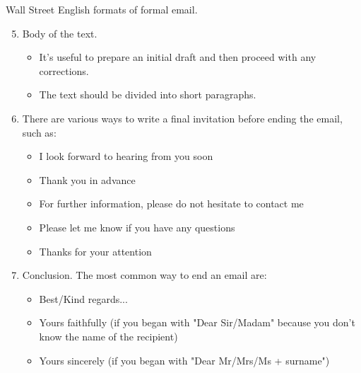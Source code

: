 \documentclass{beamer}
\begin{document}
\begin{frame}{Wall Street English formats of formal email.}
  \begin{enumerate}
    \setcounter{enumi}{4}
    \item Body of the text.
          \begin{itemize}
            \item It's useful to prepare an initial draft and then proceed with any corrections.
            \item The text should be divided into short paragraphs.
          \end{itemize}
    \item There are various ways to write a final invitation before ending the email, such as:
          \begin{itemize}
            \item I look forward to hearing from you soon
            \item Thank you in advance
            \item For further information, please do not hesitate to contact me
            \item Please let me know if you have any questions
            \item Thanks for your attention
          \end{itemize}
    \item Conclusion. The most common way to end an email are:
          \begin{itemize}
            \item Best/Kind regards...
            \item Yours faithfully (if you began with "Dear Sir/Madam" because you don't know the name of the recipient)
            \item Yours sincerely (if you began with "Dear Mr/Mrs/Ms + surname")
          \end{itemize}
  \end{enumerate}
\end{frame}
\end{document}
